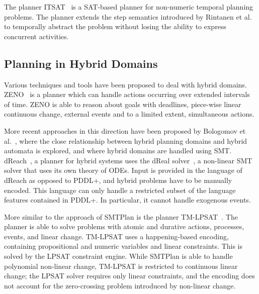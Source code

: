 The planner ITSAT~\cite{ran15} is a SAT-based planner for non-numeric temporal planning problems. The planner extends the step semantics introduced by Rintanen et al.~\cite{rin06} to temporally abstract the problem without losing the ability to express concurrent activities.

\subsection{Planning in Hybrid Domains}\label{sec:rel_hyb}

Various techniques and tools have been proposed to deal with hybrid domains. ZENO~\cite{zeno} is a planner which can handle actions occurring over extended intervals of time. ZENO is able to reason about goals with deadlines, piece-wise linear continuous change, external events and to a limited extent, simultaneous actions.

More recent approaches in this direction have been proposed by Bologomov et al.~\cite{bogomolov14}, where the close relationship between hybrid planning domains and hybrid automata is explored, and \cite{bryce} where hybrid domains are handled using SMT.
%
dReach~\cite{bryce}, a planner for hybrid systems uses the dReal solver~\cite{gao12}, a non-linear SMT solver that uses its own theory of ODEs. Input is provided in the language of dReach as opposed to PDDL+, and hybrid problems have to be manually encoded. This language can only handle a restricted subset of the language features contained in PDDL+. In particular, it cannot handle exogenous events. 

More similar to the approach of SMTPlan is the planner TM-LPSAT~\cite{TM-LPSAT}. The planner is able to solve problems with atomic and durative actions, processes, events, and linear change. TM-LPSAT uses a happening-based encoding, containing propositional and numeric variables and linear constraints. This is solved by the LPSAT constraint engine. While SMTPlan is able to handle polynomial non-linear change, TM-LPSAT is restricted to continuous linear change; the LPSAT solver requires only linear constraints, and the encoding does not account for the zero-crossing problem introduced by non-linear change.


